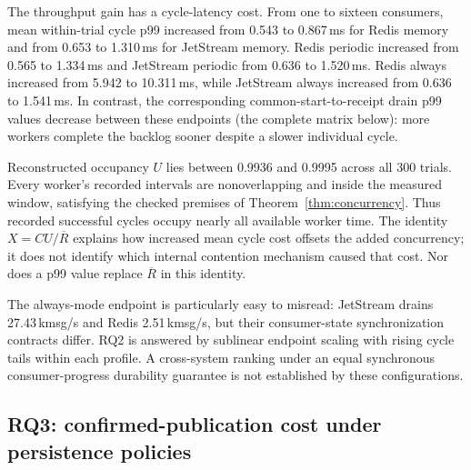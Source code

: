 \documentclass[11pt]{article}
\theoremstyle{definition}
\begin{document}
The throughput gain has a cycle-latency cost. From one to sixteen consumers, mean within-trial cycle p99 increased from 0.543 to 0.867\,ms for Redis memory and from 0.653 to 1.310\,ms for JetStream memory. Redis periodic increased from 0.565 to 1.334\,ms and JetStream periodic from 0.636 to 1.520\,ms. Redis always increased from 5.942 to 10.311\,ms, while JetStream always increased from 0.636 to 1.541\,ms. In contrast, the corresponding common-start-to-receipt drain p99 values decrease between these endpoints (the complete matrix below): more workers complete the backlog sooner despite a slower individual cycle.

Reconstructed occupancy $U$ lies between 0.9936 and 0.9995 across all 300 trials. Every worker's recorded intervals are nonoverlapping and inside the measured window, satisfying the checked premises of Theorem~\ref{thm:concurrency}. Thus recorded successful cycles occupy nearly all available worker time. The identity $X=CU/\overline R$ explains how increased mean cycle cost offsets the added concurrency; it does not identify which internal contention mechanism caused that cost. Nor does a p99 value replace $\overline R$ in this identity.

The always-mode endpoint is particularly easy to misread: JetStream drains 27.43\,kmsg/s and Redis 2.51\,kmsg/s, but their consumer-state synchronization contracts differ. RQ2 is answered by sublinear endpoint scaling with rising cycle tails within each profile. A cross-system ranking under an equal synchronous consumer-progress durability guarantee is not established by these configurations.

\subsection{RQ3: confirmed-publication cost under persistence policies}

\begin{table}[htbp]
\centering\small\setlength{\tabcolsep}{4pt}

\caption{Five-second publication workload with sixteen independent publishers. Throughput and p99 entries give means and nominal 95\% bootstrap intervals; p50 entries are means of within-trial medians. $n$ is the number of completed planned trials out of ten; the failed Redis-always trial is reported separately.}
\label{tab:durability}
\end{table}
\end{document}
